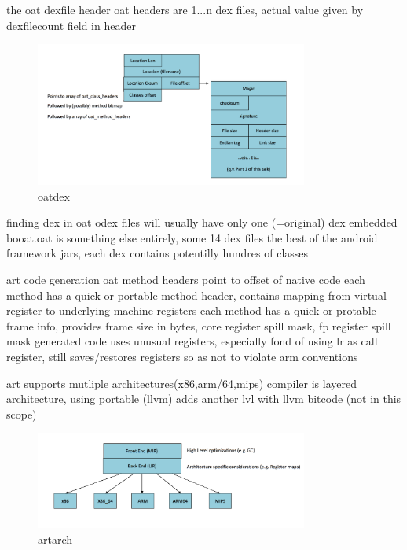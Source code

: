 the oat dexfile header
oat headers are 1...n dex files, actual value given by dexfilecount field in header
\begin{figure}[h]
    \centering
    \includegraphics[width=0.8\textwidth]{data/oatdex.png}
    \caption{oatdex}
    \label{fig:awesome_image122223}
\end{figure}


finding dex in oat
odex files will usually have only one (=original) dex embedded
booat.oat is something else entirely, some 14 dex files the best of the android framework jars, each dex contains potentilly hundres of classes

art code generation
oat method headers point to offset of native code
each method has a quick or portable method header, contains mapping from virtual register to underlying machine registers
each method has a quick or protable frame info, provides frame size in bytes, core register spill mask, fp register spill mask
generated code uses unusual registers, especially fond of using lr as call register, still saves/restores registers so as not to violate arm conventions
\newline

art supports mutliple architectures(x86,arm/64,mips)
compiler is layered architecture, using portable (llvm) adds another lvl with llvm bitcode (not in this scope)
\begin{figure}[h]
    \centering
    \includegraphics[width=0.8\textwidth]{data/artarch.png}
    \caption{artarch}
    \label{fig:artarch}
\end{figure}

